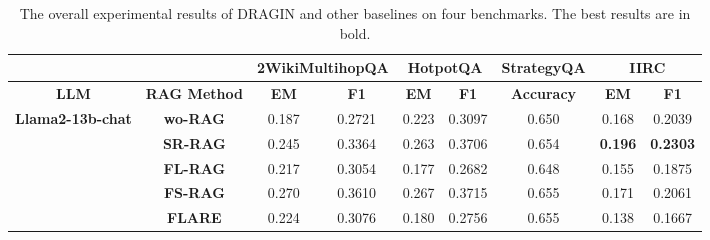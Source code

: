 \begin{table*}[t]
\caption{The overall experimental results of DRAGIN and other baselines on four benchmarks. The best results are in bold.}
\label{tab:overall}
\centering
\small
\begin{tabular}{ccccccccc}
\toprule
                                          &                 & \multicolumn{2}{c}{\textbf{2WikiMultihopQA}} & \multicolumn{2}{c}{\textbf{HotpotQA}} & \textbf{StrategyQA} & \multicolumn{2}{c}{\textbf{IIRC}} \\
                                          \midrule
\textbf{LLM}                              & \textbf{RAG Method} & \textbf{EM}          & \textbf{F1}           & \textbf{EM}       & \textbf{F1}       & \textbf{Accuracy}         & \textbf{EM}     & \textbf{F1}     \\
\toprule
\multirow{6}{*}{\textbf{Llama2-13b-chat}} & \textbf{wo-RAG} & 0.187                & 0.2721                & 0.223             & 0.3097            & 0.650                & 0.168& 0.2039          \\
                                          & \textbf{SR-RAG}  & 0.245                & 0.3364                & 0.263             & 0.3706            & 0.654                & \textbf{0.196}& \textbf{0.2303}\\
                                          & \textbf{FL-RAG} & 0.217                & 0.3054                & 0.177             & 0.2682            & 0.648               & 0.155& 0.1875          \\
                                          & \textbf{FS-RAG} & 0.270                 & 0.3610                 & 0.267             & 0.3715            & 0.655               & 0.171& 0.2061          \\
                                                                                    & \textbf{FLARE}  & 0.224                & 0.3076                & 0.180              & 0.2756            & 0.655               & 0.138& 0.1667          \\


\end{tabular}
\end{table*}

